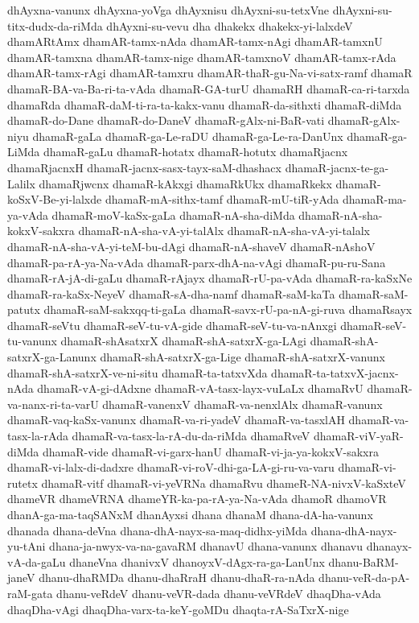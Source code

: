 {dhAyxna-vanunx
dhAyxna-yoVga
dhAyxnisu
dhAyxni-su-tetxVne
dhAyxni-su-titx-dudx-da-riMda
dhAyxni-su-vevu
dha
dhakekx
dhakekx-yi-lalxdeV
dhamARtAmx
dhamAR-tamx-nAda
dhamAR-tamx-nAgi
dhamAR-tamxnU
dhamAR-tamxna
dhamAR-tamx-nige
dhamAR-tamxnoV
dhamAR-tamx-rAda
dhamAR-tamx-rAgi
dhamAR-tamxru
dhamAR-thaR-gu-Na-vi-satx-ramf
dhamaR
dhamaR-BA-va-Ba-ri-ta-vAda
dhamaR-GA-turU
dhamaRH
dhamaR-ca-ri-tarxda
dhamaRda
dhamaR-daM-ti-ra-ta-kakx-vanu
dhamaR-da-sithxti
dhamaR-diMda
dhamaR-do-Dane
dhamaR-do-DaneV
dhamaR-gAlx-ni-BaR-vati
dhamaR-gAlx-niyu
dhamaR-gaLa
dhamaR-ga-Le-raDU
dhamaR-ga-Le-ra-DanUnx
dhamaR-ga-LiMda
dhamaR-gaLu
dhamaR-hotatx
dhamaR-hotutx
dhamaRjacnx
dhamaRjacnxH
dhamaR-jacnx-sasx-tayx-saM-dhashacx
dhamaR-jacnx-te-ga-Lalilx
dhamaRjwcnx
dhamaR-kAkxgi
dhamaRkUkx
dhamaRkekx
dhamaR-koSxV-Be-yi-lalxde
dhamaR-mA-sithx-tamf
dhamaR-mU-tiR-yAda
dhamaR-ma-ya-vAda
dhamaR-moV-kaSx-gaLa
dhamaR-nA-sha-diMda
dhamaR-nA-sha-kokxV-sakxra
dhamaR-nA-sha-vA-yi-talAlx
dhamaR-nA-sha-vA-yi-talalx
dhamaR-nA-sha-vA-yi-teM-bu-dAgi
dhamaR-nA-shaveV
dhamaR-nAshoV
dhamaR-pa-rA-ya-Na-vAda
dhamaR-parx-dhA-na-vAgi
dhamaR-pu-ru-Sana
dhamaR-rA-jA-di-gaLu
dhamaR-rAjayx
dhamaR-rU-pa-vAda
dhamaR-ra-kaSxNe
dhamaR-ra-kaSx-NeyeV
dhamaR-sA-dha-namf
dhamaR-saM-kaTa
dhamaR-saM-patutx
dhamaR-saM-sakxqq-ti-gaLa
dhamaR-savx-rU-pa-nA-gi-ruva
dhamaRsayx
dhamaR-seVtu
dhamaR-seV-tu-vA-gide
dhamaR-seV-tu-va-nAnxgi
dhamaR-seV-tu-vanunx
dhamaR-shAsatxrX
dhamaR-shA-satxrX-ga-LAgi
dhamaR-shA-satxrX-ga-Lanunx
dhamaR-shA-satxrX-ga-Lige
dhamaR-shA-satxrX-vanunx
dhamaR-shA-satxrX-ve-ni-situ
dhamaR-ta-tatxvXda
dhamaR-ta-tatxvX-jacnx-nAda
dhamaR-vA-gi-dAdxne
dhamaR-vA-tasx-layx-vuLaLx
dhamaRvU
dhamaR-va-nanx-ri-ta-varU
dhamaR-vanenxV
dhamaR-va-nenxlAlx
dhamaR-vanunx
dhamaR-vaq-kaSx-vanunx
dhamaR-va-ri-yadeV
dhamaR-va-tasxlAH
dhamaR-va-tasx-la-rAda
dhamaR-va-tasx-la-rA-du-da-riMda
dhamaRveV
dhamaR-viV-yaR-diMda
dhamaR-vide
dhamaR-vi-garx-hanU
dhamaR-vi-ja-ya-kokxV-sakxra
dhamaR-vi-lalx-di-dadxre
dhamaR-vi-roV-dhi-ga-LA-gi-ru-va-varu
dhamaR-vi-rutetx
dhamaR-vitf
dhamaR-vi-yeVRNa
dhamaRvu
dhameR-NA-nivxV-kaSxteV
dhameVR
dhameVRNA
dhameYR-ka-pa-rA-ya-Na-vAda
dhamoR
dhamoVR
dhanA-ga-ma-taqSANxM
dhanAyxsi
dhana
dhanaM
dhana-dA-ha-vanunx
dhanada
dhana-deVna
dhana-dhA-nayx-sa-maq-didhx-yiMda
dhana-dhA-nayx-yu-tAni
dhana-ja-nwyx-va-na-gavaRM
dhanavU
dhana-vanunx
dhanavu
dhanayx-vA-da-gaLu
dhaneVna
dhanivxV
dhanoyxV-dAgx-ra-ga-LanUnx
dhanu-BaRM-janeV
dhanu-dhaRMDa
dhanu-dhaRraH
dhanu-dhaR-ra-nAda
dhanu-veR-da-pA-raM-gata
dhanu-veRdeV
dhanu-veVR-dada
dhanu-veVRdeV
dhaqDha-vAda
dhaqDha-vAgi
dhaqDha-varx-ta-keY-goMDu
dhaqta-rA-SaTxrX-nige
}
